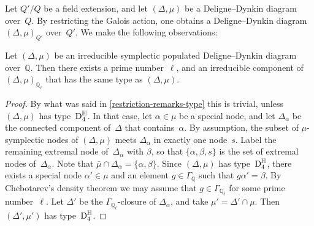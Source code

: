 \documentclass[10pt,twoside,leqno]{article}
\numberwithin{equation}{subsection}
\newcommand{\QQ}{\mathbb{Q}}
\newcommand{\QQl}{\QQ_{\ell}}
\newcommand{\RR}{\mathbb{R}}
\newcommand{\HQ}{\mathbb{H}}
\newcommand{\DtD}{\textnormal{D}}
\begin{document}
\begin{remark} %
 \label{restriction-remarks}
 Let $Q'/Q$ be a field extension,
 and let $(\Delta,\mu)$ be a Deligne--Dynkin diagram over~$Q$.
 By restricting the Galois action,
 one obtains a Deligne--Dynkin diagram $(\Delta,\mu)_{Q'}$ over~$Q'$.
 We make the following observations:
\end{remark}

\begin{lemma} %
 \label{locally-same-type}
 Let $(\Delta,\mu)$ be
 an irreducible symplectic populated Deligne--Dynkin diagram over~$\QQ$.
 Then there exists a prime number~$\ell$,
 and an irreducible component of $(\Delta,\mu)_{\QQl}$
 that has the same type as $(\Delta,\mu)$.
 \begin{proof}
  By what was said in \cref{restriction-remarks-type} this is trivial,
  unless $(\Delta,\mu)$ has type~$\DtD_4^\HQ$.
  In that case, let $\alpha \in \mu$ be a special node,
  and let $\Delta_\alpha$ be
  the connected component of~$\Delta$ that contains~$\alpha$.
  By assumption, the subset of $\mu$-symplectic nodes of $(\Delta,\mu)$
  meets $\Delta_\alpha$ in exactly one node~$s$.
  Label the remaining extremal node of~$\Delta_\alpha$ with $\beta$,
  so that $\{\alpha,\beta,s\}$ is the set of extremal nodes of~$\Delta_\alpha$.
  Note that $\bar\mu \cap \Delta_\alpha = \{\alpha,\beta\}$.
  Since $(\Delta,\mu)$ has type~$\DtD_4^\HQ$,
  there exists a special node $\alpha' \in \mu$
  and an element $g \in \Gamma_\QQ$ such that $g\alpha' = \beta$.
  By Chebotarev's density theorem
  we may assume that $g \in \Gamma_{\QQl}$ for some prime number~$\ell$.
  Let $\Delta'$ be the $\Gamma_{\QQl}$-closure of $\Delta_\alpha$,
  and take $\mu' = \Delta' \cap \mu$.
  Then $(\Delta', \mu')$ has type~$\DtD_4^\HQ$.
 \end{proof}
\end{lemma}
\end{document}
